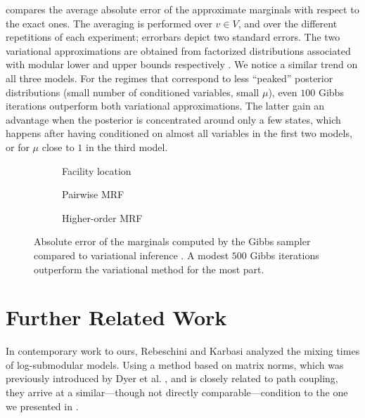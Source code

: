  compares the average absolute error of the approximate marginals with respect to the exact ones.
The averaging is performed over $v \in V$, and over the different repetitions of each experiment; errorbars depict two standard errors.
The two variational approximations are obtained from factorized distributions associated with modular lower and upper bounds respectively \cite{djolonga14}.
We notice a similar trend on all three models.
For the regimes that correspond to less ``peaked'' posterior distributions (small number of conditioned variables, small $\mu$), even $100$ Gibbs iterations outperform both variational approximations.
The latter gain an advantage when the posterior is concentrated around only a few states, which happens after having conditioned on almost all variables in the first two models, or for $\mu$ close to $1$ in the third model.

\setlength{}
\setlength{}
\newcommand{\subflen}{0.33\textwidth}
\newcommand{\scspacey}{-1.55em}
\newcommand{\scspacex}{0em}
\begin{figure}[tb]
  \begin{subfigure}[b]{\subflen}
    \centering
    
    \vspace{\scspacey}
    \caption{\hspace{\scspacex}Facility location}
    \label{fig:exp1}
  \end{subfigure}
  \begin{subfigure}[b]{\subflen}
    
    \vspace{\scspacey}
    \caption{\hspace{\scspacex}Pairwise MRF}
    \label{fig:exp2}
  \end{subfigure}
  \begin{subfigure}[b]{\subflen}
    
    \vspace{\scspacey}
    \caption{\hspace{\scspacex}Higher-order MRF}
    \label{fig:exp3}
  \end{subfigure}
  \caption{Absolute error of the marginals computed by the Gibbs sampler compared to variational inference \cite{djolonga14}.
  	A modest $500$ Gibbs iterations outperform the variational method for the most part.}
  \label{fig:exp}
\end{figure}

\section{Further Related Work}
In contemporary work to ours, Rebeschini and Karbasi \cite{rebeschini15} analyzed the mixing times of log-submodular models.
Using a method based on matrix norms, which was previously introduced by Dyer et al. \cite{dyer09}, and is closely related to path coupling, they arrive at a similar---though not directly comparable---condition to the one we presented in .

